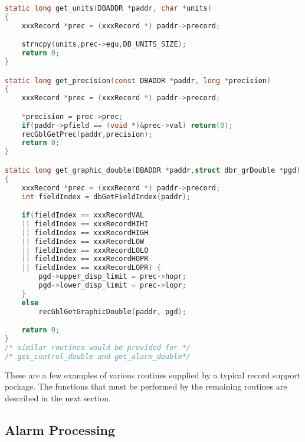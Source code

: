 \begin{lstlisting}[language=C]
static long get_units(DBADDR *paddr, char *units)
{
    xxxRecord *prec = (xxxRecord *) paddr->precord;

    strncpy(units,prec->egu,DB_UNITS_SIZE);
    return 0;
}

static long get_precision(const DBADDR *paddr, long *precision)
{
    xxxRecord *prec = (xxxRecord *) paddr->precord;

    *precision = prec->prec;
    if(paddr->pfield == (void *)&prec->val) return(0);
    recGblGetPrec(paddr,precision);
    return 0;
}

static long get_graphic_double(DBADDR *paddr,struct dbr_grDouble *pgd)
{
    xxxRecord *prec = (xxxRecord *) paddr->precord;
    int fieldIndex = dbGetFieldIndex(paddr);

    if(fieldIndex == xxxRecordVAL
    || fieldIndex == xxxRecordHIHI
    || fieldIndex == xxxRecordHIGH
    || fieldIndex == xxxRecordLOW
    || fieldIndex == xxxRecordLOLO
    || fieldIndex == xxxRecordHOPR
    || fieldIndex == xxxRecordLOPR) {
        pgd->upper_disp_limit = prec->hopr;
        pgd->lower_disp_limit = prec->lopr;
    }
    else
        recGblGetGraphicDouble(paddr, pgd);

    return 0;
}
/* similar routines would be provided for */
/* get_control_double and get_alarm_double*/
\end{lstlisting}

These are a few examples of various routines supplied by a typical record support package.
The functions that must be performed by the remaining routines are described in the next section.

\subsection{Alarm Processing}

